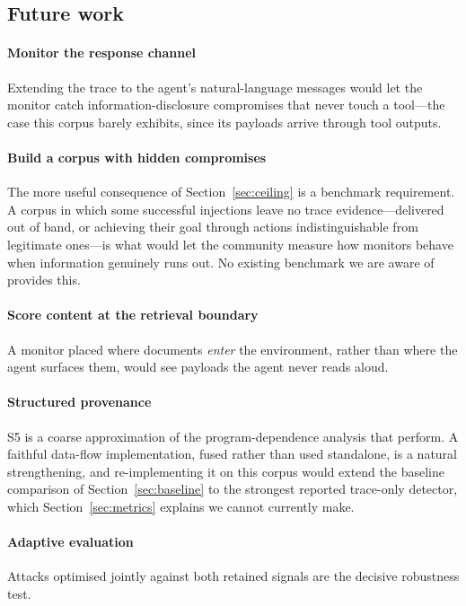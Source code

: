 \documentclass[preprint,12pt,authoryear]{elsarticle}
\theoremstyle{definition}
\begin{document}
\subsection{Future work}

\paragraph{Monitor the response channel} Extending the trace to the agent's
natural-language messages would let the monitor catch information-disclosure
compromises that never touch a tool---the case this corpus barely exhibits, since
its payloads arrive through tool outputs.

\paragraph{Build a corpus with hidden compromises} The more useful consequence of
Section~\ref{sec:ceiling} is a benchmark requirement. A corpus in which some
successful injections leave no trace evidence---delivered out of band, or achieving
their goal through actions indistinguishable from legitimate ones---is what would
let the community measure how monitors behave when information genuinely runs out.
No existing benchmark we are aware of provides this.

\paragraph{Score content at the retrieval boundary} A monitor placed where
documents \emph{enter} the environment, rather than where the agent surfaces them,
would see payloads the agent never reads aloud.

\paragraph{Structured provenance} S5 is a coarse approximation of the
program-dependence analysis that \citet{wang2025agentarmor} perform. A faithful
data-flow implementation, fused rather than used standalone, is a natural
strengthening, and re-implementing it on this corpus would extend the baseline
comparison of Section~\ref{sec:baseline} to the strongest reported trace-only
detector, which Section~\ref{sec:metrics} explains we cannot currently make.

\paragraph{Adaptive evaluation} Attacks optimised jointly against both
retained signals are the decisive robustness test.
\end{document}
